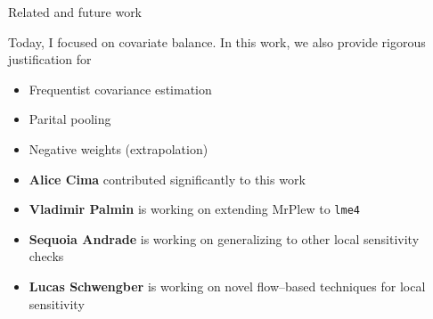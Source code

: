 \begin{frame}{Related and future work}

Today, I focused on covariate balance.  In this work, we also provide rigorous justification for
%
\begin{itemize}
\item Frequentist covariance estimation
\item Parital pooling
\item Negative weights (extrapolation)
\end{itemize}
%
\pause

\begin{itemize}
\item \textbf{Alice Cima} contributed significantly to this work
\item \textbf{Vladimir Palmin} is working on extending MrPlew to \texttt{lme4}
\item \textbf{Sequoia Andrade} is working on generalizing to other local sensitivity checks
\item \textbf{Lucas Schwengber} is working on novel flow--based techniques for local sensitivity
\end{itemize}




\end{frame}



